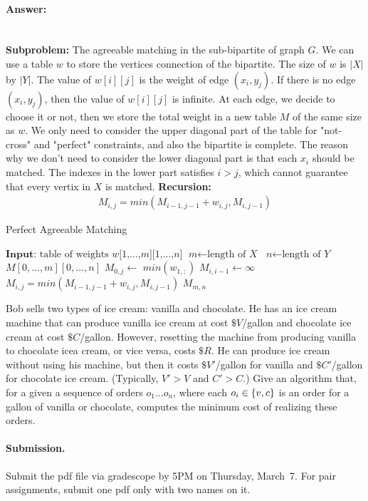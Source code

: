 \documentclass[11pt]{article}
\begin{document}
\paragraph{Answer:}\mbox{} \\
\textbf{Subproblem:}
The agreeable matching in the sub-bipartite of graph $G$.\newline
We can use a table $w$ to store the vertices connection of the bipartite. The size of $w$ is $|X|$ by $|Y|$. The value of $w[i][j]$ is the weight of edge $(x_i,y_j)$. If there is no edge $(x_i,y_j)$, then the value of $w[i][j]$ is infinite.
At each edge, we decide to choose it or not, then we store the total weight in a new table $M$ of the same size as $w$.\newline
We only need to consider the upper diagonal part of the table for "not-cross" and "perfect" constraints, and also the bipartite is complete. The reason why we don't need to consider the lower diagonal part is that each $x_i$ should be matched. The indexes in the lower part satisfies $i>j$, which cannot guarantee that every vertix in $X$ is matched. \newline
\textbf{Recursion:}
\begin{gather*}
    M_{i,j} = min(M_{i-1,j-1}+w_{i,j}, M_{i,j-1})
\end{gather*}
\begin{algorithm}
    \begin{algorithmic}[1]
    \caption{Perfect Agreeable Matching}
        \State $\textbf{Input: } \text{table of weights } \textit{w[1,...,m][1,...,n]}$
        \State $\textit{m} \gets \text{length of } \textit{X}$
        \State $\textit{n} \gets \text{length of } \textit{Y}$
        \State {} $M[0,...,m][0,...,n]$
            \State $M_{0,j} \gets$ $min(w_{1,:})$
        \EndFor
            \State $M_{i,i-1} \gets \infty$
        \EndFor
                \State $M_{i,j} = min(M_{i-1,j-1}+w_{i,j}, M_{i,j-1})$
            \EndFor
        \EndFor
        \Return $M_{m,n}$
    \end{algorithmic}
\end{algorithm}



\begin{problem}
Bob sells two types of ice cream: vanilla and chocolate. He has an ice cream machine that can produce vanilla ice cream at cost $\$ V$/gallon and chocolate ice cream at cost $\$ C$/gallon. However, resetting the machine from producing vanilla to chocolate icea cream, or vice versa, costs $\$ R$.
He can produce ice cream without using his machine, but then it costs $\$ V'$/gallon for vanilla and $\$ C'$/gallon for chocolate ice cream. (Typically, $V' > V$ and $C' > C$.) Give an algorithm that, for a  given a sequence of orders $o_1\dots o_n$, where each $o_i \in{\left\{ v,c \right\} }$ is an order for a gallon of vanilla or chocolate, computes the minimum
cost of realizing these orders.
\end{problem}


\vskip 0.3in
\paragraph{Submission.}
Submit the pdf file via gradescope by 5PM on Thursday, March~7. For pair assignments, submit one pdf only with two names on it.
\end{document}
